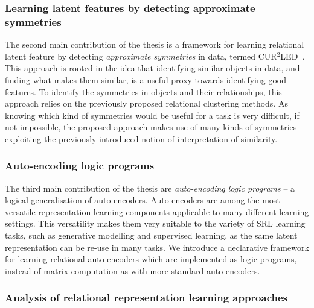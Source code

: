 \subsubsection{Learning latent features by detecting approximate symmetries}

The second main contribution of the thesis is a framework for learning relational latent feature by detecting \textit{approximate symmetries} in data, termed CUR$^2$LED~\cite{Dumancic2017}.
This approach is rooted in the idea that identifying similar objects in data, and finding what makes them similar, is a useful proxy towards identifying good features.
To identify the symmetries in objects and their relationships, this approach relies on the previously proposed relational clustering methods.
As knowing which kind of symmetries would be useful for a task is very difficult, if not impossible, the proposed approach makes use of many kinds of symmetries exploiting the previously introduced notion of interpretation of similarity.
 






\subsubsection{Auto-encoding logic programs}

The third main contribution of the thesis are \textit{auto-encoding logic programs} \cite{Dumancic2018a,AlpsSubmitted} -- a logical generalisation of auto-encoders.
Auto-encoders are among the most versatile representation learning components applicable to many different learning settings.
This versatility makes them very suitable to the variety of SRL learning tasks, such as generative modelling and supervised learning, as the same latent representation can be re-use in many tasks.
We introduce a declarative framework for learning relational auto-encoders which are implemented as logic programs, instead of matrix computation as with more standard auto-encoders.






\subsubsection{Analysis of relational representation learning approaches}

